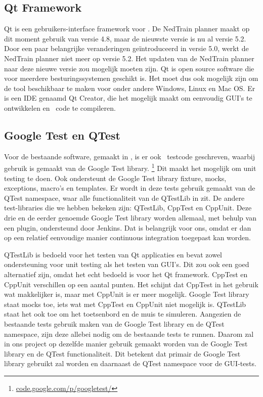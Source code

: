 \subsection{Qt Framework}
Qt is een gebruikers-interface framework voor \cpp. De NedTrain planner maakt op dit moment gebruik van versie 4.8, maar de nieuwste versie is nu al versie 5.2. Door een paar belangrijke veranderingen ge\"introduceerd in versie 5.0, werkt de NedTrain planner niet meer op versie 5.2. Het updaten van de NedTrain planner naar deze nieuwe versie zou mogelijk moeten zijn. Qt is open source software die voor meerdere besturingssystemen geschikt is. Het moet dus ook mogelijk zijn om de tool beschikbaar te maken voor onder andere Windows, Linux en Mac OS. Er is een IDE genaamd Qt Creator, die het mogelijk maakt om eenvoudig GUI's te ontwikkelen en \cpp\ code te compileren.

\subsection{Google Test en QTest}
Voor de bestaande software, gemaakt in \cpp, is er ook \cpp\ testcode geschreven, waarbij gebruik is gemaakt van de Google Test library. \footnote{\href{https://code.google.com/p/googletest/}{code.google.com/p/googletest/}} Dit maakt het mogelijk om unit testing te doen. Ook ondersteunt de Google Test library fixture, mocks, exceptions, macro's en templates. Er wordt in deze tests gebruik gemaakt van de QTest namespace, waar alle functionaliteit van de QTestLib in zit. De andere test-libraries die we hebben bekeken zijn: QTestLib, CppTest en CppUnit. Deze drie en de eerder genoemde Google Test library worden allemaal, met behulp van een plugin, ondersteund door Jenkins. Dat is belangrijk voor ons, omdat er dan op een relatief eenvoudige manier continuous integration toegepast kan worden. 

QTestLib is bedoeld voor het testen van Qt applicaties en bevat zowel ondersteuning voor unit testing als het testen van GUI's. Dit zou ook een goed alternatief zijn, omdat het echt bedoeld is voor het Qt framework. CppTest en CppUnit verschillen op een aantal punten. Het schijnt dat CppTest in het gebruik wat makkelijker is, maar met CppUnit is er meer mogelijk. Google Test library staat mocks toe, iets wat met CppTest en CppUnit niet mogelijk is. QTestLib staat het ook toe om het toetsenbord en de muis te simuleren. Aangezien de bestaande tests gebruik maken van de Google Test library en de QTest namespace, zijn deze allebei nodig om de bestaande tests te runnen. Daarom zal in ons project op dezelfde manier gebruik gemaakt worden van de Google Test library en de QTest functionaliteit. Dit betekent dat primair de Google Test library gebruikt zal worden en daarnaast de QTest namespace voor de GUI-tests. 

